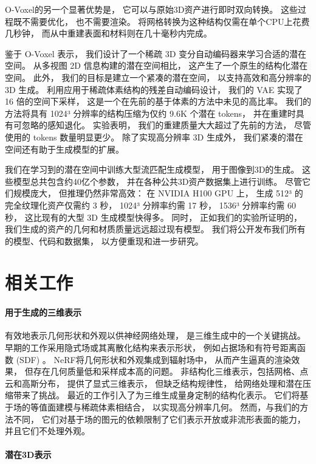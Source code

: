 O-Voxel的另一个显著优势是，
它可以与原始3D资产进行即时双向转换。
这些过程既不需要优化，
也不需要渲染。
将网格转换为这种结构仅需在单个CPU上花费几秒钟，
而从中重建表面和材料则在几十毫秒内完成。

鉴于 O-Voxel 表示，
我们设计了一个稀疏 3D 变分自动编码器来学习合适的潜在空间。
从多视图 2D 信息构建的潜在空间相比，
这产生了一个原生的结构化潜在空间。
此外，
我们的目标是建立一个紧凑的潜在空间，
以支持高效和高分辨率的 3D 生成。
利用应用于稀疏体素结构的残差自动编码设计，
我们的 VAE 实现了 16 倍的空间下采样，
这是一个在先前的基于体素的方法中未见的高比率。
我们的方法将具有 1024³ 分辨率的结构压缩为仅约 9.6K 个潜在 tokens，
并在重建时具有可忽略的感知退化。
实验表明，
我们的重建质量大大超过了先前的方法，
尽管使用的 tokens 数量明显更少。
除了实现高分辨率 3D 生成外，
我们紧凑的潜在空间还有助于生成模型的扩展。

我们在学习到的潜在空间中训练大型流匹配生成模型，
用于图像到3D的生成。
这些模型总共包含约40亿个参数，
并在各种公共3D资产数据集上进行训练。
尽管它们规模庞大，
但推理仍然非常高效：
在 NVIDIA H100 GPU 上，
生成 512³ 的完全纹理化资产仅需约 3 秒，
1024³ 分辨率约需 17 秒，
1536³ 分辨率约需 60 秒，
这比现有的大型 3D 生成模型快得多。
同时，
正如我们的实验所证明的，
我们生成的资产的几何和材质质量远远超过现有模型。
我们将公开发布我们所有的模型、代码和数据集，
以方便重现和进一步研究。

\section{相关工作}

\paragraph{用于生成的三维表示}  

有效地表示几何形状和外观以供神经网络处理，
是三维生成中的一个关键挑战。
早期的工作采用隐式场或其离散化结构来表示形状，
例如占据场和有符号距离函数 (SDF) 。
NeRF将几何形状和外观集成到辐射场中，
从而产生逼真的渲染效果，
但存在几何质量低和采样成本高的问题。
非结构化三维表示，包括网格、点云和高斯分布，
提供了显式三维表示，
但缺乏结构规律性，
给网络处理和潜在压缩带来了挑战。
最近的工作引入了为三维生成量身定制的结构化表示。
它们将基于场的等值面建模与稀疏体素相结合，
以实现高分辨率几何。
然而，与我们的方法不同，
它们对基于场的图元的依赖限制了它们表示开放或非流形表面的能力，
并且它们不处理外观。

\paragraph{潜在3D表示}

